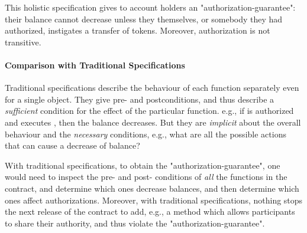 { \vspace{.09cm}  
 
 \noindent
 
  
%






 This holistic specification  gives  to  account holders an "authorization-guarantee": their balance cannot decrease unless they themselves,  or somebody they had  authorized, instigates a transfer of tokens. Moreover, authorization is not transitive.
 
\paragraph{Comparison with Traditional Specifications} 
 Traditional  specifications %
 describe the behaviour of each function separately even for a single object. 
 They  give pre- and postconditions, %
  and thus describe a  {\em sufficient} condition for the effect of the particular function. 
%
 e.g., if   is authorized and executes , then   the balance decreases. But they are {\em implicit} about the overall behaviour and the   {\em necessary} conditions, 
e.g., what are all the possible actions that can cause a decrease of balance?

  
With traditional  specifications, to obtain the "authorization-guarantee", one would need to inspect the pre- and post- conditions of {\em all} the functions 
in the contract, and determine which ones decrease balances, and then determine which ones affect authorizations. 
Moreover, with traditional  specifications, nothing stops the next release of the contract to add, e.g., a method which 
allows participants to share their authority, and thus
 violate the "authorization-guarantee".
 }
